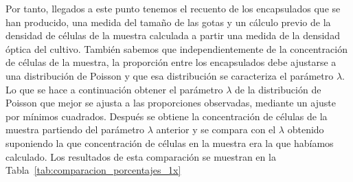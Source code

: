 Por tanto, llegados a este punto tenemos el recuento de los encapsulados que se han producido, una medida del tamaño de las gotas y un cálculo previo de la densidad de células de la muestra calculada a partir una medida de la densidad óptica del cultivo. También sabemos que independientemente de la concentración de células de la muestra, la proporción entre los encapsulados debe ajustarse a una distribución de Poisson y que esa distribución se caracteriza el parámetro $\lambda$. 
Lo que se hace a continuación obtener el parámetro $\lambda$ de la distribución de Poisson que mejor se ajusta a las proporciones observadas, mediante un ajuste por mínimos cuadrados. Después se obtiene la concentración de células de la muestra partiendo del parámetro $\lambda$ anterior y se compara con el $\lambda$ obtenido suponiendo la que concentración de células en la muestra era la que habíamos calculado. Los resultados de esta comparación se muestran en la Tabla~\ref{tab:comparacion_porcentajes_1x}


